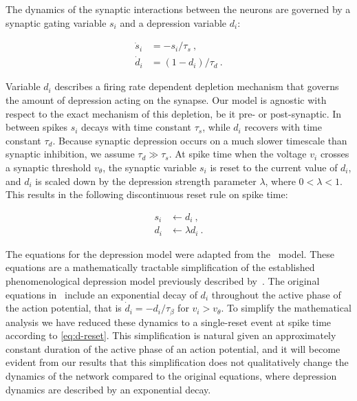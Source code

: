 \documentclass[utf8]{frontiersFPHY} %
\begin{document}
The dynamics of the synaptic interactions between the neurons are governed by a synaptic gating variable $s_{i}$ and a depression variable $d_{i}$:
\begin{linenomath}
  \begin{align}
    \dot s_{i} &= -s_{i}/\tau_{s}~\label{eq:dot-s},\\
    \dot d_{i} &= (1-d_{i})/\tau_{d}~\label{eq:dot-d}.
  \end{align}
\end{linenomath}
Variable $d_{i}$ describes a firing rate dependent depletion mechanism that governs the amount of depression acting on the synapse.
Our model is agnostic with respect to the exact mechanism of this depletion, be it pre- or post-synaptic.
In between spikes $s_{i}$ decays with time constant $\tau_{s}$, while $d_{i}$ recovers with time constant $\tau_{d}$.
Because synaptic depression occurs on a much slower timescale than synaptic inhibition, we assume $\tau_{d}\gg\tau_{s}$.
At spike time when the voltage $v_{i}$ crosses a synaptic threshold $v_{\theta}$, the synaptic variable $s_{i}$ is reset to the current value of $d_{i}$, and $d_{i}$ is scaled down by the depression strength parameter $\lambda$, where $0<\lambda<1$.
This results in the following discontinuous reset rule on spike time:
\begin{linenomath}
  \begin{align}
    s_{i} &\leftarrow d_{i}~\label{eq:s-reset},\\
    d_{i} &\leftarrow \lambda d_{i}~\label{eq:d-reset}.
  \end{align}
\end{linenomath}
The equations for the depression model were adapted from the~\citet{bose2001} model.
These equations are a mathematically tractable simplification of the established phenomenological depression model previously described by~\citet{tsodyks1997}.
The original equations in~\cite{bose2001} include an exponential decay of $d_{i}$ throughout the active phase of the action potential, that is $\dot d_{i}=-d_{i}/\tau_{\beta}$ for $v_{i}>v_{\theta}$.
To simplify the mathematical analysis we have reduced these dynamics to a single-reset event at spike time according to \cref{eq:d-reset}.
This simplification is natural given an approximately constant duration of the active phase of an action potential, and it will become evident from our results that this simplification does not qualitatively change the dynamics of the network compared to the original equations, where depression dynamics are described by an exponential decay.
\end{document}
